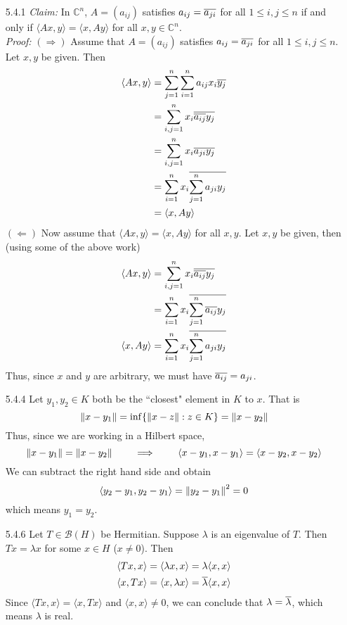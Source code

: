 \documentclass[../../Solutions.tex]{subfiles}
\begin{document}
\begin{itemize}
	\item [5.4.1] \textit{Claim:} In $\mathbb{C}^n$, $A = (a_{ij})$ satisfies $a_{ij} = \overline{a_{ji}}$ for all $1 \leq i,j \leq n$ if and only if $\langle Ax,y \rangle = \langle x,Ay \rangle$ for all $x,y \in \mathbb{C}^n$. \\
		\textit{Proof:} $(\Rightarrow)$ Assume that $A = (a_{ij})$ satisfies $a_{ij} = \overline{a_{ji}}$ for all $1 \leq i,j \leq n$. Let $x,y$ be given. Then
		\begin{align*}
			\langle Ax,y \rangle &= \sum_{j=1}^n \sum_{i=1}^n a_{ij}x_i\overline{y_j} \\
				&= \sum_{i,j = 1}^n x_i \overline{\overline{a_{ij}}y_j} \\
				&= \sum_{i,j = 1}^n x_i \overline{a_{ji}y_j} \\
				&= \sum_{i=1}^n x_i \overline{\sum_{j=1}^n a_{ji}y_j} \\
				&= \langle x,Ay \rangle
		\end{align*}
		$(\Leftarrow)$ Now assume that $\langle Ax,y \rangle = \langle x,Ay \rangle$ for all $x,y$. Let $x,y$ be given, then (using some of the above work)
		\begin{align*}
			\langle Ax,y \rangle &= \sum_{i,j = 1}^n x_i \overline{\overline{a_{ij}}y_j} \\
				&= \sum_{i=1}^n x_i \overline{\sum_{j=1}^n \overline{a_{ij}}y_j} \\
			\langle x,Ay \rangle &= \sum_{i=1}^n x_i \overline{\sum_{j=1}^n a_{ji}y_j}
		\end{align*}
		Thus, since $x$ and $y$ are arbitrary, we must have $\overline{a_{ij}} = a_{ji}$.
	
	\item [5.4.4] Let $y_1,y_2 \in K$ both be the ``closest" element in $K$ to $x$. That is
		$$ \left\lVert x-y_1\right\rVert = \inf\{ \left\lVert x-z\right\rVert : z \in K \} = \left\lVert x-y_2\right\rVert $$
		Thus, since we are working in a Hilbert space,
		$$ \left\lVert x-y_1\right\rVert = \left\lVert x-y_2\right\rVert \qquad\implies\qquad \langle x-y_1,x-y_1 \rangle = \langle x-y_2,x-y_2 \rangle $$
		We can subtract the right hand side and obtain
		$$ \langle y_2 - y_1,y_2 - y_1 \rangle = \left\lVert y_2 - y_1\right\rVert^2 = 0 $$
		which means $y_1 = y_2$.
	
	\item [5.4.6] Let $T \in \mathcal{B}(H)$ be Hermitian. Suppose $\lambda$ is an eigenvalue of $T$. Then $Tx = \lambda x$ for some $x \in H$ ($x \neq 0$). Then
		\begin{align*}
			\langle Tx,x \rangle &= \langle \lambda x,x \rangle = \lambda \langle x,x \rangle \\
			\langle x,Tx \rangle &= \langle x,\lambda x \rangle = \overline{\lambda} \langle x,x \rangle
		\end{align*}
		Since $\langle Tx,x \rangle = \langle x,Tx \rangle$ and $\langle x,x \rangle \neq 0$, we can conclude that $\lambda = \overline{\lambda}$, which means $\lambda$ is real.
	

\end{itemize}
\end{document}
